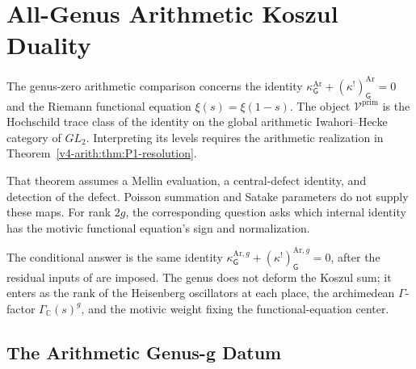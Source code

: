 \chapter{All-Genus Arithmetic Koszul Duality}
\label{v4-arith:all-genus-koszul}

The genus-zero arithmetic comparison concerns the identity
\(\kappa^{\mathrm{Ar}}_{\mathsf G}+(\kappa^!)^{\mathrm{Ar}}_{\mathsf G}=0\)
and the Riemann functional equation \(\xi(s)=\xi(1-s)\).
The object \(\mathcal V^{\mathrm{prim}}\) is the Hochschild trace
class of the identity on the global arithmetic Iwahori--Hecke
category of \(GL_2\). Interpreting its levels requires the arithmetic
realization in Theorem~\ref{v4-arith:thm:P1-resolution}.

That theorem assumes a Mellin evaluation, a central-defect identity,
and detection of the defect. Poisson summation and Satake parameters
do not supply these maps. For rank \(2g\), the corresponding question
asks which internal identity has the motivic functional equation's
sign and normalization.

The conditional answer is the same identity
\(\kappa^{\mathrm{Ar},g}_{\mathsf{G}}+(\kappa^{!})^{\mathrm{Ar},g}_{\mathsf{G}}=0\),
after the residual inputs of  are imposed.
The genus does not deform the Koszul sum; it enters as the rank of the
Heisenberg oscillators at each place, the archimedean
\(\Gamma\)-factor \(\Gamma_{\mathbb{C}}(s)^g\), and the motivic weight
fixing the functional-equation center.

\section{The Arithmetic Genus-g Datum}
\label{v4-arith:ag:datum}

